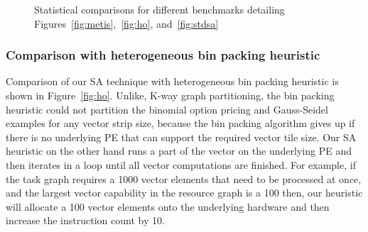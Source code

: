 \begin{figure}[t!]
{\begin{tabular}{|c|c|c|c|c|c|}
    \end{tabular}
    \label{tab:3}
  } 
  \caption{Statistical comparisons for different benchmarks detailing
    Figures~\ref{fig:metis},~\ref{fig:ho}, and~\ref{fig:stdsa}}
  \label{fig:8}
\end{figure}

\subsubsection{Comparison with heterogeneous bin packing heuristic}
\label{sec:comp-with-heter}

Comparison of our SA technique with heterogeneous bin packing heuristic
is shown in Figure~\ref{fig:ho}. Unlike, K-way graph partitioning, the
bin packing heuristic could not partition the binomial option pricing
and Gauss-Seidel examples for any vector strip size, because the bin
packing algorithm gives up if there is no underlying PE that can support
the required vector tile size. Our SA heuristic on the other hand runs a
part of the vector on the underlying PE and then iterates in a loop
until all vector computations are finished. For example, if the task
graph requires a 1000 vector elements that need to be processed at once,
and the largest vector capability in the resource graph is a 100 then,
our heuristic will allocate a 100 vector elements onto the underlying
hardware and then increase the instruction count by 10.

